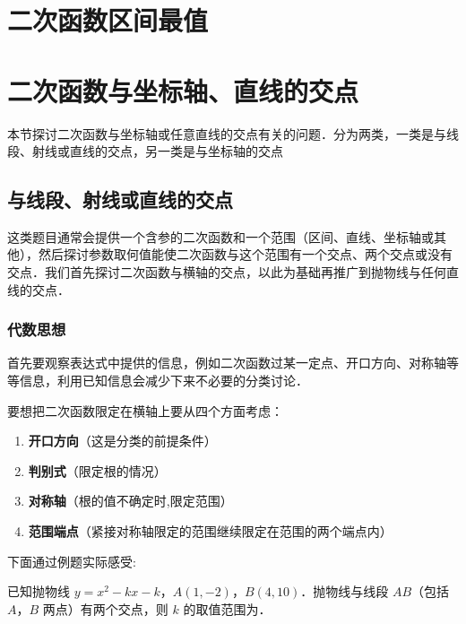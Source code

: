 \documentclass[lang=cn, 10pt, titlestyle=display, oneside, toc=twocol]{elegantbook}
\begin{document}
\section{二次函数区间最值}

\section{二次函数与坐标轴、直线的交点}

本节探讨二次函数与坐标轴或任意直线的交点有关的问题．分为两类，一类是与线段、射线或直线的交点，另一类是与坐标轴的交点
\subsection{与线段、射线或直线的交点}
这类题目通常会提供一个含参的二次函数和一个范围（区间、直线、坐标轴或其他），然后探讨参数取何值能使二次函数与这个范围有一个交点、两个交点或没有交点．我们首先探讨二次函数与横轴的交点，以此为基础再推广到抛物线与任何直线的交点．
\subsubsection*{代数思想}






首先要观察表达式中提供的信息，例如二次函数过某一定点、开口方向、对称轴等等信息，利用已知信息会减少下来不必要的分类讨论．

要想把二次函数限定在横轴上要从四个方面考虑：
\begin{enumerate}
    \item \textbf{开口方向}（这是分类的前提条件）
    \item \textbf{判别式}（限定根的情况）
    \item \textbf{对称轴}（根的值不确定时,限定范围）
    \item \textbf{范围端点}（紧接对称轴限定的范围继续限定在范围的两个端点内）
\end{enumerate}

下面通过例题实际感受:

\begin{example}
    已知抛物线 \( y = x^2 - kx - k \)，\( A (1, -2) \)，\( B (4, 10) \)．抛物线与线段 \( AB \)（包括 \( A \)，\( B \) 两点）有两个交点，则 \( k \) 的取值范围为\underline{\hspace{4.5em}}．
\end{example}
\end{document}

